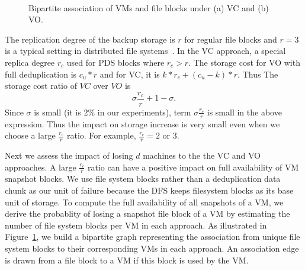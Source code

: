 \begin{figure}
    \centering
    \\
    \caption{Bipartite association of VMs and file blocks under (a) VC and (b) VO. }
    \label{fig:share}
\end{figure}

The replication degree of the backup storage 
is $r$ for regular file blocks and $r=3$ is a typical setting in distributed
file systems~\cite{googlefs03,hdfs10}.
In the VC approach, a special replica degree $r_c$ used for PDS blocks where $r_c>r$. 
The storage cost for VO with full deduplication is $c_u *r$ and for VC, it is
$ k*r_c  + (c_u-k)*r$. Thus The storage cost ratio of $VC$ over $VO$ is 
\[
\sigma \frac{r_c}{r} + 1-\sigma.
\]
Since $\sigma$ is small (it is 2\% in our experiments),  
term $\sigma \frac{r_c}{r}$ is small in the above expression.  
Thus the impact on storage increase is very small even when we choose a large $\frac{r_c}{r}$ ratio. 
For example, $\frac{r_c}{r}=2$ or 3. 

Next we  assess  the impact of losing $d$ machines 
to the the VC and VO approaches.  
A large $\frac{r_c}{r}$ ratio can have a positive impact on full availability of VM snapshot blocks.
We use file system blocks rather than a deduplication
data chunk as our unit of failure because the DFS keeps
filesystem blocks as its base unit of storage.
To compute the full availability of all snapshots of a VM, we derive
the probablity of losing a snapshot file block of a VM by
estimating the number of file system blocks per VM in each approach.
As illustrated in Figure~\ref{fig:share},
we build a bipartite graph representing the association from unique file system blocks
to their corresponding VMs in each approach. An association edge is  drawn  from a file block  to a VM 
if this block is used by the VM. 

